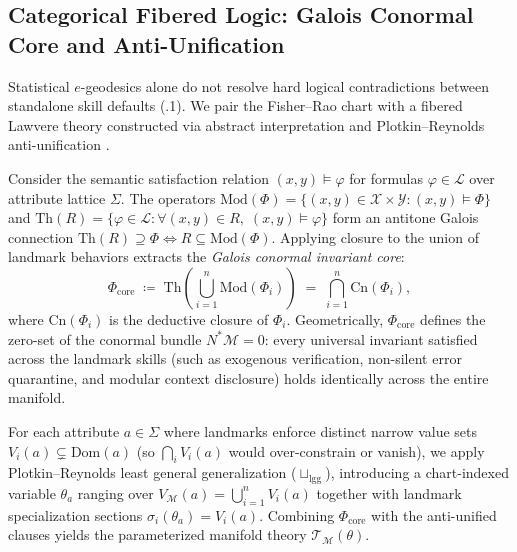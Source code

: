 \documentclass[11pt]{article}
\theoremstyle{definition}
\theoremstyle{plain}
\newcommand{\Xcal}{\mathcal{X}}
\newcommand{\Ycal}{\mathcal{Y}}
\newcommand{\Mcal}{\mathcal{M}}
\newcommand{\Tcal}{\mathcal{T}}
\newcommand{\Lcal}{\mathcal{L}}
\newcommand{\Phicore}{\Phi_{\mathrm{core}}}
\begin{document}
\subsection{Categorical Fibered Logic: Galois Conormal Core and Anti-Unification}
\label{subsec:logic}

Statistical $e$-geodesics alone do not resolve hard logical contradictions between standalone skill defaults (.1). We pair the Fisher--Rao chart with a fibered Lawvere theory \citep{lawvere1963functorial} constructed via abstract interpretation \citep{cousot1977abstract} and Plotkin--Reynolds anti-unification \citep{plotkin1970note,reynolds1970transformational}.

Consider the semantic satisfaction relation $(x, y) \models \varphi$ for formulas $\varphi \in \Lcal$ over attribute lattice $\Sigma$. The operators $\mathrm{Mod}(\Phi) = \{(x,y) \in \Xcal \times \Ycal : (x,y) \models \Phi\}$ and $\mathrm{Th}(R) = \{\varphi \in \Lcal : \forall (x,y) \in R,\; (x,y) \models \varphi\}$ form an antitone Galois connection $\mathrm{Th}(R) \supseteq \Phi \iff R \subseteq \mathrm{Mod}(\Phi)$. Applying closure to the union of landmark behaviors extracts the \emph{Galois conormal invariant core}:
\begin{equation}
  \Phicore \;\coloneqq\; \mathrm{Th}\!\left(\bigcup_{i=1}^n \mathrm{Mod}(\Phi_i)\right) \;=\; \bigcap_{i=1}^n \mathrm{Cn}(\Phi_i),
  \label{eq:conormal-core}
\end{equation}
where $\mathrm{Cn}(\Phi_i)$ is the deductive closure of $\Phi_i$. Geometrically, $\Phicore$ defines the zero-set of the conormal bundle $N^*\Mcal = 0$: every universal invariant satisfied across the landmark skills (such as exogenous verification, non-silent error quarantine, and modular context disclosure) holds identically across the entire manifold.

For each attribute $a \in \Sigma$ where landmarks enforce distinct narrow value sets $V_i(a) \subsetneq \mathrm{Dom}(a)$ (so $\bigcap_i V_i(a)$ would over-constrain or vanish), we apply Plotkin--Reynolds least general generalization ($\sqcup_{\mathrm{lgg}}$), introducing a chart-indexed variable $\theta_a$ ranging over $V_{\Mcal}(a) = \bigcup_{i=1}^n V_i(a)$ together with landmark specialization sections $\sigma_i(\theta_a) = V_i(a)$. Combining $\Phicore$ with the anti-unified clauses yields the parameterized manifold theory $\Tcal_{\Mcal}(\theta)$.
\end{document}
